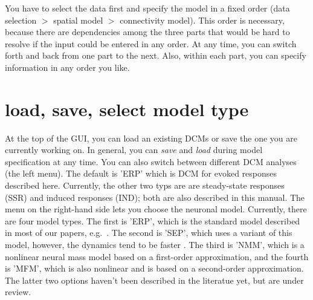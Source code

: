 You have to select the data first and specify the model in
a fixed order (data selection $>$ spatial model $>$
connectivity model). This order is necessary, because there are
dependencies among the three parts that would be hard to resolve
if the input could be entered in any order. At any time, you can switch forth and back from one part to
the next. Also, within each part, you can specify information in any
order you like.  

\section{load, save, select model type}
At the top of the GUI, you can load an existing DCMs or save the one
you are currently working on. In general, you can \textit{save} and
\textit{load} during model specification at any time. You can also
switch between different DCM analyses (the left menu). The default is 'ERP' which is DCM
for evoked responses described here. Currently, the other two typs are are steady-state responses
(SSR) and induced responses (IND); both are also described in this
manual. The menu on the right-hand side lets you choose the neuronal model. Currently, there are four model types. The first is 'ERP', which is the standard model described in most of our papers, e.g.~\cite{od_dcm_erp}. The second is 'SEP', which uses a variant of this model, however, the dynamics tend to be faster \cite{andre_sigmoid}. The third is 'NMM', which is a nonlinear neural mass model based on a first-order approximation, and the fourth is 'MFM', which is also nonlinear and is based on a second-order approximation. The latter two options haven't been described in the literatue yet, but are under review.


